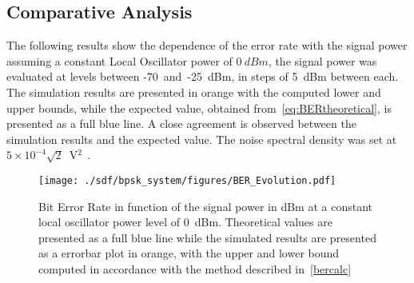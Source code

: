 \begin{refsection}
\subsection{Comparative Analysis}

The following results show the dependence of the error rate with the signal power assuming a constant Local Oscillator power of $0~dBm$, the signal power was evaluated at levels between -70~and~-25~dBm, in steps of 5~dBm between each. The simulation results are presented in orange with the computed lower and upper bounds, while the expected value, obtained from~\eqref{eq:BERtheoretical}, is presented as a full blue line. A close agreement is observed between the simulation results and the expected value. The noise spectral density was set at $5\times10^{-4}\sqrt{2}$~V$^2$~\cite{thorlabs}.
\begin{figure}[H]
\centering
\texttt{[image: ./sdf/bpsk\_system/figures/BER\_Evolution.pdf]}
\caption{Bit Error Rate in function of the signal power in dBm at a constant local oscillator power level of 0~dBm. Theoretical values are presented as a full blue line while the simulated results are presented as a errorbar plot in orange, with the upper and lower bound computed in accordance with the method described in~\ref{bercalc}}
\label{fig:berevolution}
\end{figure}


\clearpage
\printbibliography[heading=subbibliography]
\end{refsection}
\cleardoublepage
